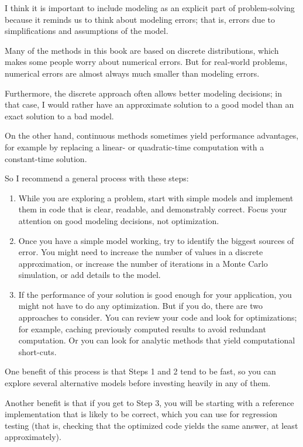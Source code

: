 \documentclass[12pt]{book}
\begin{document}
I think it is important to include modeling as an explicit part
of problem-solving because it reminds us to think about modeling
errors; that is, errors due to simplifications and assumptions
of the model.

Many of the methods in this book are based on discrete distributions,
which makes some people worry about numerical errors.  But for
real-world problems, numerical errors are almost always much
smaller than modeling errors.

Furthermore, the discrete approach often allows better modeling
decisions; in that case, I would rather have an approximate solution
to a good model than an exact solution to a bad model.

On the other hand, continuous methods sometimes yield performance
advantages, for example by replacing a linear- or quadratic-time
computation with a constant-time solution.

So I recommend a general process with these steps:

\begin{enumerate}

\item While you are exploring a problem, start with simple models
and implement them in code that is clear, readable, and demonstrably
correct.  Focus your attention on good modeling decisions, not
optimization.

\item Once you have a simple model working, try to identify the
biggest sources of error.  You might need to increase the number
of values in a discrete approximation, or increase
the number of iterations in a Monte Carlo simulation, or add
details to the model.

\item If the performance of your solution is good enough for your
application, you might not have to do any optimization.  But if
you do, there are two approaches
to consider.  You can review your code and look for optimizations; for
example, caching previously computed results to avoid redundant
computation.  Or you can look for analytic methods that
yield computational short-cuts.  

\end{enumerate}

One benefit of this process is that Steps 1 and 2 tend to be fast, so you
can explore several alternative models before investing heavily in any
of them.

Another benefit is that if you get to Step 3, you will be starting
with a reference implementation that is likely to be correct,
which you can use for regression testing (that is, checking that the
optimized code yields the same answer, at least approximately).
\end{document}
